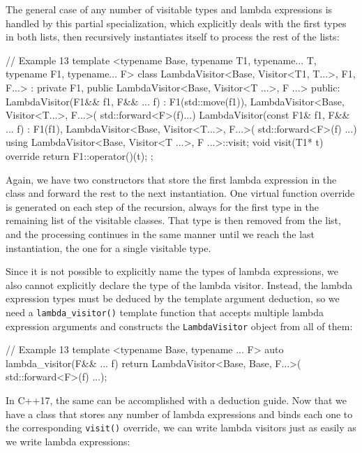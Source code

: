 The general case of any number of visitable types and lambda expressions is handled by this partial specialization, which explicitly deals with the first types in both lists, then recursively instantiates itself to process the rest of the lists:

\begin{code}
// Example 13
template <typename Base,
          typename T1, typename... T,
          typename F1, typename... F>
class LambdaVisitor<Base, Visitor<T1, T...>, F1, F...> :
  private F1,
  public LambdaVisitor<Base, Visitor<T ...>, F ...>
{
  public:
  LambdaVisitor(F1&& f1, F&& ... f) :
    F1(std::move(f1)),
    LambdaVisitor<Base, Visitor<T...>, F...>(
      std::forward<F>(f)...)
  {}
  LambdaVisitor(const F1& f1, F&& ... f) :
    F1(f1),
    LambdaVisitor<Base, Visitor<T...>, F...>(
      std::forward<F>(f) ...)
  {}
  using LambdaVisitor<Base, Visitor<T ...>, F ...>::visit;
  void visit(T1* t) override { return F1::operator()(t); }
};
\end{code}

Again, we have two constructors that store the first lambda expression in the class and forward the rest to the next instantiation. One virtual function override is generated on each step of the recursion, always for the first type in the remaining list of the visitable classes. That type is then removed from the list, and the processing continues in the same manner until we reach the last instantiation, the one for a single visitable type.

Since it is not possible to explicitly name the types of lambda expressions, we also cannot explicitly declare the type of the lambda visitor. Instead, the lambda expression types must be deduced by the template argument deduction, so we need a \texttt{lambda\_visitor()} template function that accepts multiple lambda expression arguments and constructs the \texttt{LambdaVisitor} object from all of them:

\begin{code}
// Example 13
template <typename Base, typename ... F>
auto lambda_visitor(F&& ... f) {
  return LambdaVisitor<Base, Base, F...>(
    std::forward<F>(f) ...);
}
\end{code}

In C++17, the same can be accomplished with a deduction guide. Now that we have a class that stores any number of lambda expressions and binds each one to the corresponding \texttt{visit()} override, we can write lambda visitors just as easily as we write lambda expressions:

